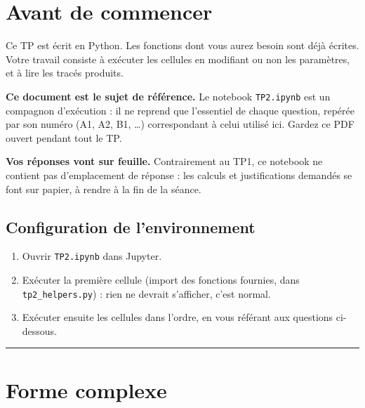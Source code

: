 \documentclass[a4paper,11pt]{article}
\title{\chapterTitle}
\author{}
\date{}
\makeatletter
\newcounter{question}[section]
\renewcommand\maketitle{{\raggedright\begin{center}
    {\Huge\bfseries\@title}
\end{center}}}
\makeatother
\begin{document}
\selectfont
\fontsize{12pt}{14pt}\selectfont

\maketitle
\thispagestyle{fancy}


\section*{Avant de commencer}

Ce TP est écrit en Python. Les fonctions dont vous aurez besoin sont déjà
écrites. Votre travail consiste à exécuter les cellules en modifiant ou
non les paramètres, et à lire les tracés produits.

\textbf{Ce document est le sujet de référence.} Le notebook
\texttt{TP2.ipynb} est un compagnon d'exécution : il ne reprend que
l'essentiel de chaque question, repérée par son numéro (A1, A2, B1,
\dots) correspondant à celui utilisé ici. Gardez ce PDF ouvert pendant
tout le TP.

\textbf{Vos réponses vont sur feuille.} Contrairement au TP1, ce
notebook ne contient pas d'emplacement de réponse : les calculs et
justifications demandés se font sur papier, à rendre à la fin de la
séance.

\subsection*{Configuration de l'environnement}
\begin{enumerate}
    \item Ouvrir \texttt{TP2.ipynb} dans Jupyter.
    \item Exécuter la première cellule (import des fonctions fournies,
          dans \texttt{tp2\_helpers.py}) : rien ne devrait s'afficher,
          c'est normal.
    \item Exécuter ensuite les cellules dans l'ordre, en vous référant aux
          questions ci-dessous.
\end{enumerate}

\vspace{2em}\hrule\vspace{2em}
\newpage


\section{Forme complexe}
\end{document}
